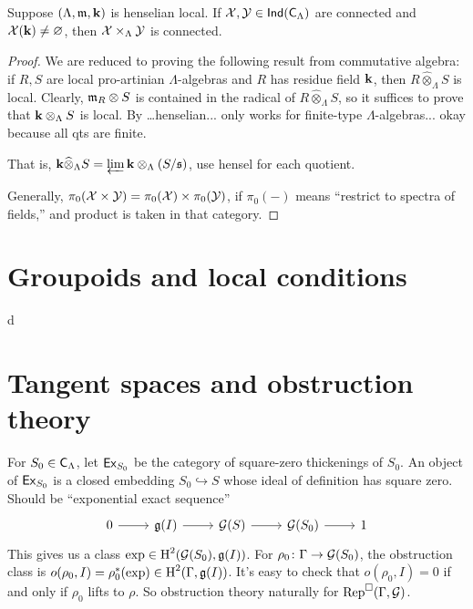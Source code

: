 \documentclass[phd,cornellheadings,draft]{cornell}
\begin{document}
\begin{theorem}
Suppose $(\Lambda,\mathfrak{m},\mathbf{k})$ is henselian local. If 
$\mathcal{X},\mathcal{Y}\in \operatorname{\mathsf{Ind}}(\mathsf{C}_\Lambda)$ are connected and $\mathcal{X}(\mathbf{k})\ne\varnothing$, 
then $\mathcal{X}\times_\Lambda \mathcal{Y}$ is connected. 
\end{theorem}
\begin{proof}
We are reduced to proving the following result from commutative algebra: if 
$R,S$ are local pro-artinian $\Lambda$-algebras and $R$ has residue field 
$\mathbf{k}$, then $R\widehat\otimes_\Lambda S$ is local. Clearly, 
$\mathfrak{m}_R\otimes S$ is contained in the radical of $R\widehat\otimes_\Lambda S$, 
so it suffices to prove that $\mathbf{k}\otimes_\Lambda S$ is local. By 
\cite[18.5.?]{ega4-4}\ldots henselian... only works for finite-type $\Lambda$-algebras...
okay because all qts are finite.

That is, $\mathbf{k}\widehat\otimes_\Lambda S = \varprojlim \mathbf{k}\otimes_\Lambda (S/\mathfrak s)$, 
use hensel for each quotient. 

Generally, $\pi_0(\mathcal{X}\times \mathcal{Y})=\pi_0(\mathcal{X})\times \pi_0(\mathcal{Y})$, if $\pi_0(-)$ 
means ``restrict to spectra of fields,'' and product is taken in that category. 
\end{proof}





\section{Groupoids and local conditions}

d





\section{Tangent spaces and obstruction theory}

For $S_0\in \mathsf{C}_\Lambda$, let $\mathsf{Ex}_{S_0}$ be the category of square-zero 
thickenings of $S_0$. An object of $\mathsf{Ex}_{S_0}$ is a closed embedding 
$S_0\hookrightarrow S$ whose ideal of definition has square zero. Should be 
``exponential exact sequence''
\[
\begin{tikzcd}
	0 \ar[r]
		& \fg(I) \ar[r]
		& \cG(S) \ar[r]
		& \cG(S_0) \ar[r]
		& 1
\end{tikzcd}
\]
This gives us a class $\exp\in \operatorname{H}^2(\mathcal{G}(S_0),\mathfrak{g}(I))$. For 
$\rho_0\colon \Gamma\to \mathcal{G}(S_0)$, the obstruction class is 
$o(\rho_0,I) = \rho_0^\ast(\exp)\in \operatorname{H}^2(\Gamma,\mathfrak{g}(I))$. It's easy to check 
that $o(\rho_0,I)=0$ if and only if $\rho_0$ lifts to $\rho$. So obstruction 
theory naturally for $\operatorname{Rep}^\square(\Gamma,\mathcal{G})$. 
\end{document}
